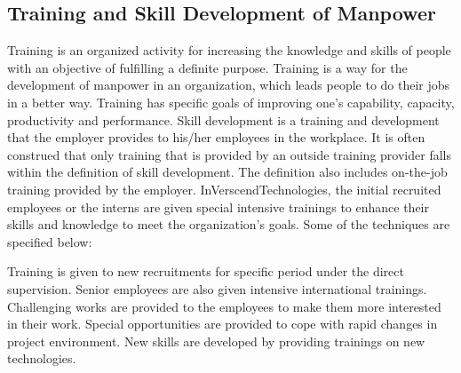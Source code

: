 \subsection{Training and Skill Development of Manpower}
Training is an organized activity for increasing the knowledge and skills of people with an objective of
fulfilling a definite purpose. Training is a way for the development of manpower in an organization, which
leads people to do their jobs in a better way. Training has specific goals of improving one's capability,
capacity, productivity and performance.
Skill development is a training and development that the employer provides to his/her employees in the
workplace. It is often construed that only training that is provided by an outside training provider falls within
the definition of skill development. The definition also includes on-the-job training provided by the employer.
InVerscendTechnologies, the initial recruited employees or the interns are given special intensive
trainings to enhance their skills and knowledge to meet the organization’s goals.
Some of the techniques are specified below:
\begin{enumerate}
\itemize Training is given to new recruitments for specific period under the direct supervision.
\itemize Senior employees are also given intensive international trainings.
\itemize Challenging works are provided to the employees to make them more interested in their work.
\itemize Special opportunities are provided to cope with rapid changes in project environment.
\itemize New skills are developed by providing trainings on new technologies.
\end{enumerate}
